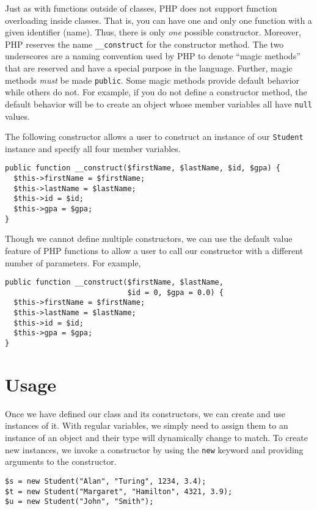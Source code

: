 Just as with functions outside of classes, PHP does not support 
function overloading inside classes.  That is, you can have
one and only one function with a given identifier (name).  Thus,
there is only \emph{one} possible constructor.  Moreover, PHP 
reserves the name \texttt{__construct} for the constructor
method.  The two underscores are a naming convention used by PHP
to denote  
``magic methods'' that are reserved and have a special
purpose in the language.  Further, magic methods \emph{must} be
made \texttt{public}.  Some magic methods provide default
behavior while others do not.  For example, if you do not
define a constructor method, the default behavior will be to
create an object whose member variables all have \texttt{null} values.  

The following constructor allows a user to construct an instance of
our \texttt{Student} instance and specify all four member 
variables.

\begin{verbatim}
public function __construct($firstName, $lastName, $id, $gpa) {
  $this->firstName = $firstName;
  $this->lastName = $lastName;
  $this->id = $id;
  $this->gpa = $gpa;
}
\end{verbatim}

Though we cannot define multiple constructors, we can use the 
default value feature of PHP functions to allow a user to call our
constructor with a different number of parameters.  For example, 

\begin{verbatim}
public function __construct($firstName, $lastName, 
                            $id = 0, $gpa = 0.0) {
  $this->firstName = $firstName;
  $this->lastName = $lastName;
  $this->id = $id;
  $this->gpa = $gpa;
}
\end{verbatim}

\section{Usage}

Once we have defined our class and its constructors, we can 
create and use instances of it.  With regular variables, 
we simply need to assign them to an instance of an object and
their type will dynamically change to match.  To create new
instances, we invoke a constructor by using the \texttt{new} 
keyword and providing arguments to the constructor.

\begin{verbatim}
$s = new Student("Alan", "Turing", 1234, 3.4);
$t = new Student("Margaret", "Hamilton", 4321, 3.9);
$u = new Student("John", "Smith");
\end{verbatim}

